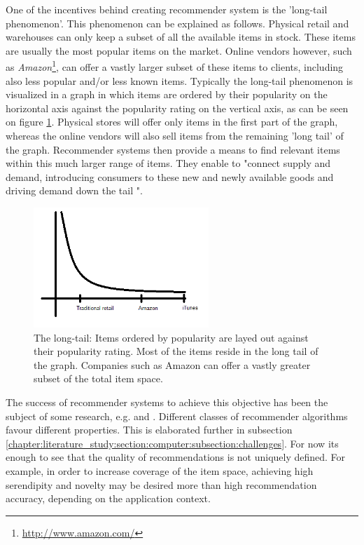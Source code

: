 One of the incentives behind creating recommender system is the 'long-tail phenomenon'. This phenomenon can be explained as follows. Physical retail and warehouses can only keep a subset of all the available items in stock. These items are usually the most popular items on the market. Online vendors however, such as \emph{Amazon}\footnote{\url{http://www.amazon.com/}}, can offer a vastly larger subset of these items to clients, including also less popular and/or less known items\cite{rajaraman:2012}. Typically the long-tail phenomenon is visualized in a graph in which items are ordered by their popularity on the horizontal axis against the popularity rating on the vertical axis, as can be seen on figure \ref{figure:longtail}. Physical stores will offer only items in the first part of the graph, whereas the online vendors will also sell items from the remaining 'long tail' of the graph\cite{rajaraman:2012, celma:2008:phd}. Recommender systems then provide a means to find relevant items within this much larger range of items\cite{rajaraman:2012}. They enable to "connect supply and demand, introducing consumers to these new and newly available goods and driving demand down the tail "\cite{anderson:2006:LTW:1197299, celma:2008:phd}.

\begin{figure}%
	\begin{center}
		\includegraphics[width=250px]{img/longtail}%
	\end{center}
	\caption{The long-tail: Items ordered by popularity are layed out against their popularity rating. Most of the items reside in the long tail of the graph. Companies such as Amazon can offer a vastly greater subset of the total item space.}%
	\label{figure:longtail}%
\end{figure}

The success of recommender systems to achieve this objective has been the subject of some research, e.g. \cite{levy:2010} and \cite{celma:2008:phd}. Different classes of recommender algorithms favour different properties\cite{burke:2002, shani:2011:9780387858197}. This is elaborated further in subsection \ref{chapter:literature_study:section:computer:subsection:challenges}. For now its enough to see that the quality of recommendations is not uniquely defined. For example, in order to increase coverage of the item space, achieving high serendipity and novelty may be desired more than high recommendation accuracy, depending on the application context\cite{shani:2011:9780387858197, tripathi:2011, celma:2008:phd}.

